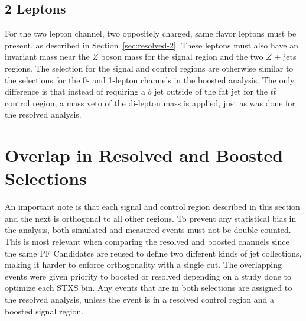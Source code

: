 \subsection{2 Leptons}

For the two lepton channel, two oppositely charged, same flavor leptons must be present,
as described in Section~\ref{sec:resolved-2}.
These leptons must also have an invariant mass near the $Z$ boson mass for the signal region
and the two $Z$ + jets regions.
The selection for the signal and control regions are otherwise similar to the selections
for the 0- and 1-lepton channels in the boosted analysis.
The only difference is that instead of requiring a $b$ jet outside of the fat jet
for the $t\bar{t}$ control region,
a mass veto of the di-lepton mass is applied, just as was done for the resolved analysis.

\section{Overlap in Resolved and Boosted Selections}

An important note is that each signal and control region described in this section and the next
is orthogonal to all other regions.
To prevent any statistical bias in the analysis,
both simulated and measured events must not be double counted.
This is most relevant when comparing the resolved and boosted channels since
the same PF Candidates are reused to define two different kinds of jet collections,
making it harder to enforce orthogonality with a single cut.
The overlapping events were given priority to boosted or resolved depending on
a study done to optimize each STXS bin.
Any events that are in both selections are assigned to the resolved analysis,
unless the event is in a resolved control region and a boosted signal region.
